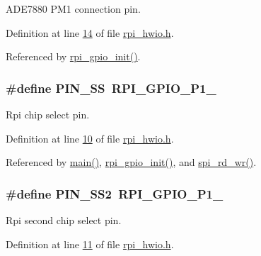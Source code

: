 A\-D\-E7880 P\-M1 connection pin. 



Definition at line \hyperlink{a00039_source_l00014}{14} of file \hyperlink{a00039_source}{rpi\-\_\-hwio.\-h}.



Referenced by \hyperlink{a00038_source_l00063}{rpi\-\_\-gpio\-\_\-init()}.

\hypertarget{a00039_ab4b553591a495409d4f7cec4b6c3e754}{
\subsubsection[{P\-I\-N\-\_\-\-S\-S}]{\setlength{\rightskip}{0pt plus 5cm}\#define P\-I\-N\-\_\-\-S\-S~R\-P\-I\-\_\-\-G\-P\-I\-O\-\_\-\-P1\-\_}}\label{d3/de7/a00039_ab4b553591a495409d4f7cec4b6c3e754}


Rpi chip select pin. 



Definition at line \hyperlink{a00039_source_l00010}{10} of file \hyperlink{a00039_source}{rpi\-\_\-hwio.\-h}.



Referenced by \hyperlink{a00035_source_l00198}{main()}, \hyperlink{a00038_source_l00063}{rpi\-\_\-gpio\-\_\-init()}, and \hyperlink{a00040_source_l00114}{spi\-\_\-rd\-\_\-wr()}.

\hypertarget{a00039_a8aa8d44cb9d876a244263493e0a2a7c5}{
\subsubsection[{P\-I\-N\-\_\-\-S\-S2}]{\setlength{\rightskip}{0pt plus 5cm}\#define P\-I\-N\-\_\-\-S\-S2~R\-P\-I\-\_\-\-G\-P\-I\-O\-\_\-\-P1\-\_}}\label{d3/de7/a00039_a8aa8d44cb9d876a244263493e0a2a7c5}


Rpi second chip select pin. 



Definition at line \hyperlink{a00039_source_l00011}{11} of file \hyperlink{a00039_source}{rpi\-\_\-hwio.\-h}.

